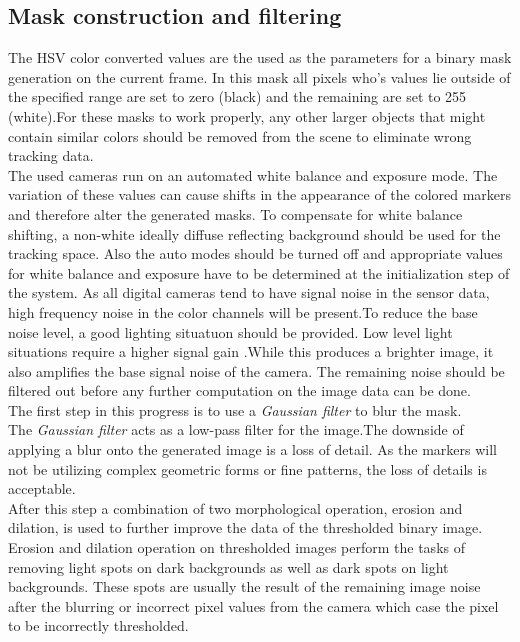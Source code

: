 \subsection{Mask construction and filtering}
The HSV color converted values are the used as the parameters for a binary mask generation on the current frame. In this mask all pixels who's values lie outside of the specified range are set to zero (black) and the remaining are set to 255 (white).For these masks to work properly, any other larger objects that might contain similar colors should be removed from the scene to eliminate wrong tracking data. \\The used cameras run on an automated white balance and exposure mode. The variation of these values can cause shifts in the appearance of the colored markers and therefore alter the generated masks. To compensate for white balance shifting, a non-white ideally diffuse reflecting background should be used for the tracking space. Also the auto modes should be turned off and appropriate values for white balance and exposure have to be determined at the initialization step of the system. As all digital cameras tend to have signal noise in the sensor data, high frequency noise in the color channels will be present.To reduce the base noise level, a good lighting situatuon should be provided. Low level light situations require a higher signal gain .While this produces a brighter image, it also amplifies the base signal noise of the camera. The remaining noise should be filtered out before any further computation on the image data can be done.\\
The first step in this progress is to use a \textit{Gaussian filter} to blur the mask.\\
The \textit{Gaussian filter} acts as a low-pass filter for the image.The downside of applying a blur onto the generated image is a loss of detail. As the markers will not be utilizing complex geometric forms or fine patterns, the loss of details is acceptable.\\
After this step a combination of two morphological operation, erosion and dilation, is used to further improve the data of the thresholded binary image\cite[chapter~3.11-12]{Davies.2017}.
Erosion and dilation operation on thresholded images perform the tasks of removing light spots on dark backgrounds as well as dark spots on light backgrounds. These spots are usually the result of the remaining image noise after the blurring or incorrect pixel values from the camera which case the pixel to be incorrectly thresholded.\\
